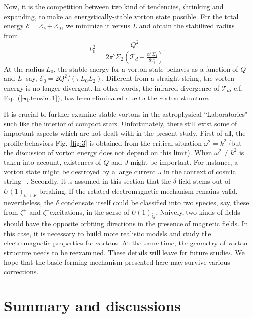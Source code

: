Now, it is the competition between two kind of tendencies, shrinking and expanding, to make an energetically-stable vorton state possible. For the total energy $\mathcal{E} = \mathcal{E}_\delta + \mathcal{E}_d$, we minimize it versus $L$ and obtain the stabilized radius from  
\begin{equation}
\label{eq:vortonr}
 L_0^2 = \frac{Q^2}{2\pi^2\Sigma_2(\mathcal{T}_d +
   \frac{\alpha' \Sigma_4}{8v_\delta^2})}.
\end{equation}
At the radius $L_0$, the stable energy for a vorton state behaves as a
function of $Q$ and $L$, say, $\mathcal{E}_0 = 2 Q^2/(\pi L_0 \Sigma_2)$.
Different from a straight string, the vorton energy is no longer divergent. In other words, the infrared divergence of $\mathcal{T}_d$, c.f. Eq.~(\ref{eq:tension1}), has been eliminated due to the vorton structure.

It is crucial to further examine stable vortons in the astrophysical ``Laboratories" such like the interior of compact stars.
Unfortunately, there still exist some of important aspects which are not dealt with in the present study. 
First of all, the profile behaviors Fig.~\ref{fig:3} is obtained from the critical situation $\omega^2 = k^2$ (but the discussion of vorton energy does not depend on this limit). When $\omega^2 \neq k^2$ is taken into account, existences of $Q$ and $J$ might be important. For instance, a vorton state might be destroyed by a large current $J$ in the context of cosmic string ~\cite{vilenkin2000cosmic}.
Secondly, it is assumed in this section that the $\delta$ field stems out of $U(1)_{C+F}$ breaking.
If the rotated electromagnetic mechanism remains valid, nevertheless, the $\delta$ condensate itself could be classified into two species, say, these from $\zeta^+$ and $\zeta^-$excitations, in the sense of $U(1)_{\widetilde{Q}}$. 
Naively, two kinds of fields should have the opposite orbiting directions in the presence of magnetic fields.
In this case, it is necessary to build more realistic models and study the electromagnetic properties for vortons. 
At the same time, the geometry of vorton structure needs to be reexamined. These details will leave for future studies. We hope that the basic forming mechanism presented here may survive various corrections.

\section{Summary and discussions}
\label{sec:4}

